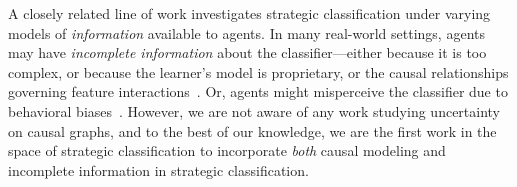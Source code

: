 A closely related line of work investigates strategic classification under varying models of \emph{information} available to agents. In many real-world settings, agents may have \emph{incomplete information} about the classifier---either because it is too complex, or because the learner's model is proprietary, or the causal relationships governing feature interactions~\cite{bechavod2022information,cohen2024bayesianstrategicclassification,ghalme2021strategic}. Or, agents might misperceive the classifier due to behavioral biases~\cite{ebrahimi2024double}.
However, we are not aware of any work studying uncertainty on causal graphs, and to the best of our knowledge, we are the first work in the space of strategic classification to incorporate \emph{both} causal modeling and incomplete information in strategic classification.






